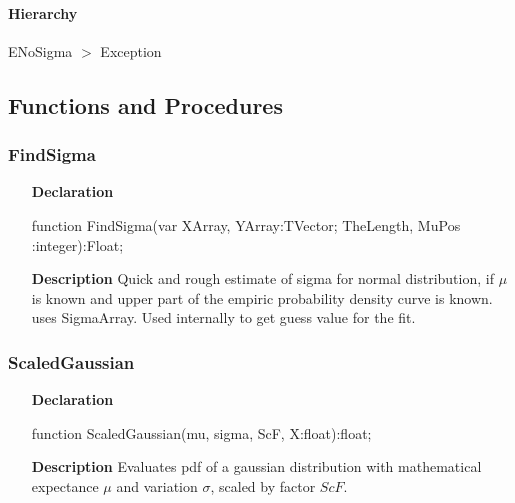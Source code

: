 \documentclass[12pt,a4paper,oneside]{report}
\newcommand{\declarationitem}[1]{\textbf{#1}}
\newcommand{\descriptiontitle}[1]{\textbf{#1}}
\begin{document}
\paragraph{Hierarchy}\hspace*{\fill}

ENoSigma {$>$} Exception
\subsection{Functions and Procedures}
\subsubsection{FindSigma}
\label{ugauss-FindSigma}
\begin{itemize}\item[\declarationitem{Declaration}\hfill]
	\begin{flushleft}
		\begin{ttfamily}
			function FindSigma(var XArray, YArray:TVector; TheLength, MuPos :integer):Float;\end{ttfamily}
	\end{flushleft}
	\item[\descriptiontitle{Description}]
	Quick and rough estimate of sigma for normal distribution, if $\mu$ is known and upper part of the empiric probability density curve is known. uses SigmaArray. Used internally to get guess value for the fit.
\end{itemize}
\subsubsection{ScaledGaussian}
\label{ugauss-ScaledGaussian}
\begin{itemize}\item[\declarationitem{Declaration}\hfill]
	\begin{flushleft}
		\begin{ttfamily}
			function ScaledGaussian(mu, sigma, ScF, X:float):float;\end{ttfamily}
		
	\end{flushleft}
	
	\par
	\item[\descriptiontitle{Description}]
	Evaluates pdf of a gaussian distribution with mathematical expectance $\mu$ and variation $\sigma$, scaled by factor $ScF$.
\end{itemize}
\end{document}
